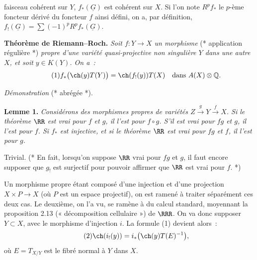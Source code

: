 faisceau cohérent sur \(Y\), \(f_*(\underline G)\) est cohérent sur \(X\). Si l'on note \(R^pf_*\) le \(p\)-ème foncteur dérivé du foncteur \(f\) ainsi défini, on a, par définition, \(f_!(\underline G)=\sum(-1)^p R^pf_*(\underline G)\).\quad*

\textbf{Théorème de Riemann--Roch.} \emph{Soit \(f:Y\longrightarrow X\) un morphisme} (* application régulière *) \emph{propre d'une variété quasi-projective non singulière \(Y\) dans une autre \(X\), et soit \(y\in K(Y)\). On a~:}
\begin{equation}\tag{1}
  f_*\bigl(\ch(y)T(Y)\bigr)=\ch(f_!(y))T(X)
  \quad\text{dans } A(X)\otimes\mathbb Q.
\end{equation}

\emph{Démonstration} (* abrégée *).

\textbf{Lemme 1.} \emph{Considérons des morphismes propres de variétés \(Z\xrightarrow{g}Y\xrightarrow{f}X\). Si le théorème \(\RR\) est vrai pour \(f\) et \(g\), il l'est pour \(f\circ g\). S'il est vrai pour \(fg\) et \(g\), il l'est pour \(f\). Si \(f_*\) est injective, et si le théorème \(\RR\) est vrai pour \(fg\) et \(f\), il l'est pour \(g\).}

Trivial. (* En fait, lorsqu'on suppose \(\RR\) vrai pour \(fg\) et \(g\), il faut encore supposer que \(g_!\) est surjectif pour pouvoir affirmer que \(\RR\) est vrai pour \(f\). *)

Un morphisme propre étant composé d'une injection et d'une projection \(X\times P\longrightarrow X\) (où \(P\) est un espace projectif), on est ramené à traiter séparément ces deux cas. Le deuxième, on l'a vu, se ramène à du calcul standard, moyennant la proposition 2.13 (« décomposition cellulaire ») de \(\RRR\). On va donc supposer \(Y\subset X\), avec le morphisme d'injection \(i\). La formule (1) devient alors~:
\begin{equation}\tag{2}
  \ch(i_!(y))=i_*\bigl(\ch(y)T(E)^{-1}\bigr),
\end{equation}
où \(E=T_{X/Y}\) est le fibré normal à \(Y\) dans \(X\).

